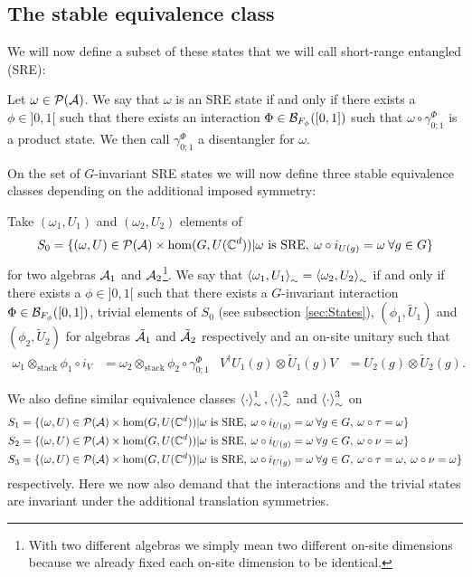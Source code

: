 \documentclass[11pt,a4paper,twoside]{article}
\numberwithin{equation}{section}
\begin{document}
	\subsection{The stable equivalence class}\label{sec:StableEquivalenceClasses}
	We will now define a subset of these states that we will call short-range entangled (SRE):
	\begin{definition}\label{def:sre}
		Let $\omega\in\PP(\AA)$. We say that $\omega$ is an SRE state if and only if there exists a $\phi\in]0,1[$ such that there exists an interaction $\Phi\in\BB_{F_\phi}([0,1])$ such that $\omega\circ\gamma^\Phi_{0;1}$ is a product state. We then call $\gamma^\Phi_{0;1}$ a disentangler for $\omega$.
	\end{definition}
	On the set of $G$-invariant SRE states we will now define three stable equivalence classes depending on the additional imposed symmetry:
	\begin{definition}
		Take $(\omega_1,U_1)$ and $(\omega_2,U_2)$ elements of
		\begin{equation}
			S_0=\{(\omega,U)\in\PP(\AA)\times\hom(G,U(\CC^d))|\omega\text{ is SRE},\:\omega\circ i_{U(g)}=\omega\:\forall g\in G\}
		\end{equation}
		for two algebras $\AA_1$ and $\AA_2$\footnote{With two different algebras we simply mean two different on-site dimensions because we already fixed each on-site dimension to be identical.}. We say that $\expval{\omega_1,U_1}_\sim=\expval{\omega_2,U_2}_\sim$ if and only if there exists a $\phi\in]0,1[$ such that there exists a $G$-invariant interaction $\Phi\in\BB_{F_\phi}([0,1])$, trivial elements of $S_0$ (see subsection \ref{sec:States}), $(\phi_1,\tilde U_1)$ and $(\phi_2,\tilde U_2)$ for algebras $\tilde\AA_1$ and $\tilde\AA_2$ respectively and an on-site unitary such that
		\begin{align}
			\omega_1\otimes_{\text{stack}}\phi_1\circ i_V&=\omega_2\otimes_{\text{stack}}\phi_2\circ\gamma^\Phi_{0;1}&V^\dagger U_{1}(g)\otimes \tilde{U}_{1}(g)V&=U_{2}(g)\otimes \tilde{U}_{2}(g).
		\end{align}
	\end{definition}
	We also define similar equivalence classes $\expval{\cdot}_\sim^1,\expval{\cdot}_\sim^2$ and $\expval{\cdot}_\sim^3$ on
	\begin{align}
		\nonumber
		S_1&=\{(\omega,U)\in\PP(\AA)\times\hom(G,U(\CC^d))|\omega\text{ is SRE},\:\omega\circ i_{U(g)}=\omega\:\forall g\in G,\:\omega\circ\tau=\omega\}\\
		S_2&=\{(\omega,U)\in\PP(\AA)\times\hom(G,U(\CC^d))|\omega\text{ is SRE},\:\omega\circ i_{U(g)}=\omega\:\forall g\in G,\:\omega\circ\nu=\omega\}\\
		\nonumber
		S_3&=\{(\omega,U)\in\PP(\AA)\times\hom(G,U(\CC^d))|\omega\text{ is SRE},\:\omega\circ i_{U(g)}=\omega\:\forall g\in G,\:\omega\circ\tau=\omega,\:\omega\circ\nu=\omega\}
	\end{align}
	respectively. Here we now also demand that the interactions and the trivial states are invariant under the additional translation symmetries.
\end{document}
